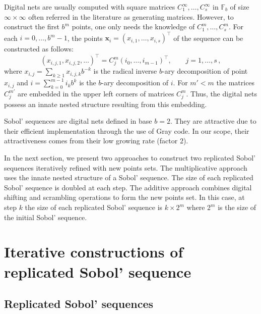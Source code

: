\documentclass[]{elsarticle}
\theoremstyle{definition}
\newcommand{\bvec}[1]{\boldsymbol{#1}}
\newcommand{\vx}{\bvec{x}}
\begin{document}
Digital nets are usually computed with square matrices $C_1^{\infty},\dots,C_s^{\infty}$ in $\mathbb{F}_b$ of size $\infty\times\infty$ often referred in the literature as generating matrices. However, to construct the first $b^m$ points, one only needs the knowledge of $C_1^m,\dots,C_s^m$. For each $i=0,\dots,b^m-1$, the points $\vx_i = (x_{i,1},\dots,x_{i,s})^\intercal$ of the sequence can be constructed as follows:
\begin{equation}
\label{dig.net.eq.}
(x_{i,j,1},x_{i,j,2},\dots)^\intercal = C_j^m (i_{0},\dots,i_{m-1})^\intercal,\qquad j= 1,\dots,s\, ,
\end{equation}
where $x_{i,j} = \sum_{k \geq 1}x_{i,j,k}b^{-k}$ is the radical inverse $b$-ary decomposition of point $x_{i,j}$ and $i = \sum_{k=0}^{m-1}i_kb^{k}$ is the $b$-ary decomposition of $i$. For $m' < m$ the matrices $C_j^{m'}$ are embedded in the upper left corners of matrices $C_j^{m}$. Thus, the digital nets possess an innate nested structure resulting from this embedding. %

Sobol' sequences are digital nets defined in base $b=2$. They are attractive due to their efficient implementation through the use of Gray code. In our scope, their attractiveness comes from their low growing rate (factor $2$). 
\bigskip

In the next section, we present two approaches to construct two replicated Sobol' sequences iteratively refined with new points sets. The multiplicative approach uses the innate nested structure of a Sobol' sequence. The size of each replicated Sobol' sequence is doubled at each step. The additive approach combines digital shifting and scrambling operations to form the new points set. In this case, at step $k$ the size of each replicated Sobol' sequence is $ k \times 2^m$ where $2^m$ is the size of the initial Sobol' sequence. 

\section{Iterative constructions of replicated Sobol' sequence}
\label{sobol.seq.cons}

\subsection{Replicated Sobol' sequences}
\end{document}
